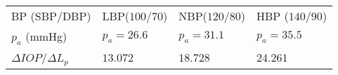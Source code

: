 \begin{tabular}{|l|l|l|l|}
\hline
BP (SBP/DBP)& LBP($100$/$70$)&NBP($120$/$80$) & HBP ($140$/$90$)\\
$p_a$ (mmHg)& $p_a = 26.6$ & $p_a = 31.1$ & $p_a = 35.5$\\
\hline
$\Delta IOP$/$\Delta L_p $& $13.072$ & $18.728$ & $24.261$\\
\hline
\end{tabular}